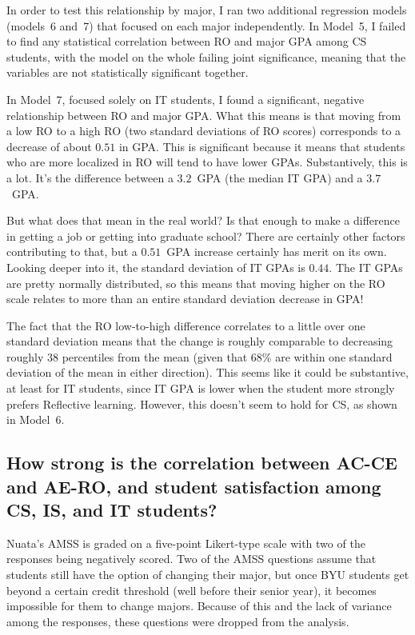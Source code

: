 In order to test this relationship by major, I ran two additional regression models (models~6 and~7) that focused on each major independently. In Model~5, I failed to find any statistical correlation between RO and major GPA among CS students, with the model on the whole failing joint significance, meaning that the variables are not statistically significant together.

In Model~7, focused solely on IT students, I found a significant, negative relationship between RO and major GPA. What this means is that moving from a low RO to a high RO (two standard deviations of RO scores) corresponds to a decrease of about $0.51$ in GPA. This is significant because it means that students who are more localized in RO will tend to have lower GPAs. Substantively, this is a lot. It's the difference between a $3.2$~GPA (the median IT GPA) and a $3.7$~GPA.

But what does that mean in the real world? Is that enough to make a difference in getting a job or getting into graduate school? There are certainly other factors contributing to that, but a $0.51$~GPA increase certainly has merit on its own. Looking deeper into it, the standard deviation of IT GPAs is $0.44$. The IT GPAs are pretty normally distributed, so this means that moving higher on the RO scale relates to more than an entire standard deviation decrease in GPA!

The fact that the RO low-to-high difference correlates to a little over one standard deviation means that the change is roughly comparable to decreasing roughly 38 percentiles from the mean (given that 68\% are within one standard deviation of the mean in either direction). This seems like it could be substantive, at least for IT students, since IT GPA is lower when the student more strongly prefers Reflective learning. However, this doesn't seem to hold for CS, as shown in Model~6.

\subsection{How strong is the correlation between AC-CE and AE-RO, and student satisfaction among CS, IS, and IT students?}
Nuata's AMSS is graded on a five-point Likert-type scale with two of the responses being negatively scored. Two of the AMSS questions assume that students still have the option of changing their major, but once BYU students get beyond a certain credit threshold (well before their senior year), it becomes impossible for them to change majors. Because of this and the lack of variance among the responses, these questions were dropped from the analysis.

